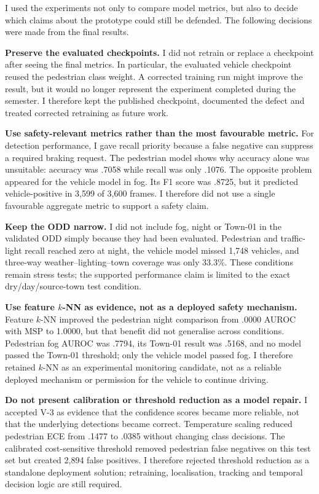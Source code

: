 \documentclass[nologo,a4paper,12pt]{article}
\begin{document}
I used the experiments not only to compare model metrics, but also to decide which claims about the
prototype could still be defended. The following decisions were made from the final results.

\textbf{Preserve the evaluated checkpoints.} I did not retrain or replace a checkpoint after seeing
the final metrics. In particular, the evaluated vehicle checkpoint reused the pedestrian class
weight. A corrected training run might improve the result, but it would no longer represent the
experiment completed during the semester. I therefore kept the published checkpoint, documented
the defect and treated corrected retraining as future work.

\textbf{Use safety-relevant metrics rather than the most favourable metric.} For detection
performance, I gave recall priority because a false negative can suppress a required braking
request. The pedestrian model shows why accuracy alone was unsuitable: accuracy was .7058 while
recall was only .1076. The opposite problem appeared for the vehicle model in fog. Its F1 score was
.8725, but it predicted vehicle-positive in 3,599 of 3,600 frames. I therefore did not use a single
favourable aggregate metric to support a safety claim.

\textbf{Keep the ODD narrow.} I did not include fog, night or Town-01 in the validated ODD simply
because they had been evaluated. Pedestrian and traffic-light recall reached zero at night, the
vehicle model missed 1,748 vehicles, and three-way weather--lighting--town coverage was only 33.3\%.
These conditions remain stress tests; the supported performance claim is limited to the exact
dry/day/source-town test condition.

\textbf{Use feature $k$-NN as evidence, not as a deployed safety mechanism.} Feature $k$-NN
improved the pedestrian night comparison from .0000 AUROC with MSP to 1.0000, but that benefit did
not generalise across conditions. Pedestrian fog AUROC was .7794, its Town-01 result was .5168,
and no model passed the Town-01 threshold; only the vehicle model passed fog. I therefore retained
$k$-NN as an experimental monitoring candidate, not as a reliable deployed mechanism or permission
for the vehicle to continue driving.

\textbf{Do not present calibration or threshold reduction as a model repair.} I accepted V-3 as
evidence that the confidence scores became more reliable, not that the underlying detections became
correct. Temperature scaling reduced pedestrian ECE from .1477 to .0385 without changing class
decisions. The calibrated cost-sensitive threshold removed pedestrian false negatives on this test
set but created 2,894 false positives. I therefore rejected threshold reduction as a standalone
deployment solution; retraining, localisation, tracking and temporal decision logic are still
required.
\end{document}
